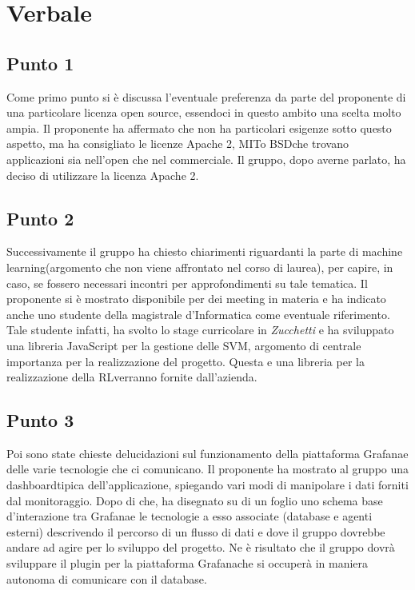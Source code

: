 \section{Verbale}
        \subsection{Punto 1}
            Come primo punto si è discussa l'eventuale preferenza da parte del proponente di una particolare licenza open source, essendoci in questo ambito una scelta molto ampia. Il proponente ha affermato che non ha particolari esigenze sotto questo aspetto, ma ha consigliato le licenze Apache 2\glo, MIT\glosp o BSD\glosp che trovano applicazioni sia nell'open che nel commerciale. Il gruppo, dopo averne parlato, ha deciso di utilizzare la licenza Apache 2\glo.
        \subsection{Punto 2}
            Successivamente il gruppo ha chiesto chiarimenti riguardanti la parte di machine learning\glosp (argomento che non viene affrontato nel corso di laurea), per capire, in caso, se fossero necessari incontri per approfondimenti su tale tematica. Il proponente si è mostrato disponibile per dei meeting in materia e ha indicato anche uno studente della magistrale d'Informatica come eventuale riferimento. Tale studente infatti, ha svolto lo stage curricolare in \textit{Zucchetti} e ha sviluppato una libreria JavaScript per la gestione delle SVM\glosp, argomento di centrale importanza per la realizzazione del progetto\glo. Questa e una libreria per la realizzazione della RL\glosp verranno fornite dall'azienda.
        \subsection{Punto 3}
            Poi sono state chieste delucidazioni sul funzionamento della piattaforma Grafana\glosp e delle varie tecnologie che ci comunicano. Il proponente ha mostrato al gruppo una dashboard\glosp tipica dell'applicazione, spiegando vari modi di manipolare i dati forniti dal monitoraggio. Dopo di che, ha disegnato su di un foglio uno schema base d'interazione tra Grafana\glosp e le tecnologie a esso associate (database e agenti esterni) descrivendo il percorso di un flusso di dati e dove il gruppo dovrebbe andare ad agire per lo sviluppo del progetto\glo. Ne è risultato che il gruppo dovrà sviluppare il plugin per la piattaforma Grafana\glosp che si occuperà in maniera autonoma di comunicare con il database.
